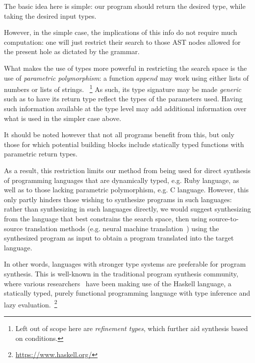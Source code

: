 \documentclass{article}
\begin{document}
The basic idea here is simple: our program should return the desired type, while taking the desired input types.

However, in the simple case, the implications of this info do not require much computation:
one will just restrict their search to those AST nodes allowed for the present hole as dictated by the grammar.

What makes the use of types more powerful in restricting the search space is the use of \emph{parametric polymorphism}:
a function $append$ may work using either lists of numbers or lists of strings.
~\footnote{Left out of scope here are \emph{refinement types}, which further aid synthesis based on conditions.}
As such, its type signature may be made \emph{generic} such as to have its return type reflect the types of the parameters used.
Having such information available at the type level may add additional information over what is used in the simpler case above.

It should be noted however that not all programs benefit from this,
but only those for which potential building blocks include statically typed functions with parametric return types.

As a result, this restriction limits our method from being used for direct synthesis of programming languages that are dynamically typed,
e.g. Ruby language, as well as to those lacking parametric polymorphism, e.g. C language.
However, this only partly hinders those wishing to synthesize programs in such languages:
rather than synthesizing in such languages directly, we would suggest synthesizing from the language that best constrains the search space,
then using source-to-source translation methods (e.g. neural machine translation~\citep{kalchbrenner2013recurrent})
using the synthesized program as input to obtain a program translated into the target language.


In other words, languages with stronger type systems are preferable for program synthesis.
This is well-known in the traditional program synthesis community,
where various researchers~\citep{synquid,hornclauses,scythe,gissurarson2018suggesting}
have been making use of the Haskell language,
a statically typed, purely functional programming language with type inference and lazy evaluation.~\footnote{\url{https://www.haskell.org/}}
\end{document}
